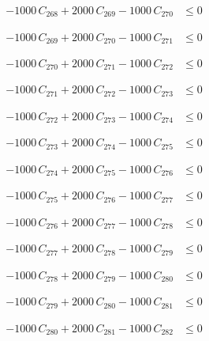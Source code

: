 \documentclass[a4paper,11pt]{article}
\begin{document}
\begin{align}
-1000\,C_{268} + 2000\,C_{269} - 1000\,C_{270} &\leq 0 \nonumber
\end{align}

\begin{align}
-1000\,C_{269} + 2000\,C_{270} - 1000\,C_{271} &\leq 0 \nonumber
\end{align}

\begin{align}
-1000\,C_{270} + 2000\,C_{271} - 1000\,C_{272} &\leq 0 \nonumber
\end{align}

\begin{align}
-1000\,C_{271} + 2000\,C_{272} - 1000\,C_{273} &\leq 0 \nonumber
\end{align}

\begin{align}
-1000\,C_{272} + 2000\,C_{273} - 1000\,C_{274} &\leq 0 \nonumber
\end{align}

\begin{align}
-1000\,C_{273} + 2000\,C_{274} - 1000\,C_{275} &\leq 0 \nonumber
\end{align}

\begin{align}
-1000\,C_{274} + 2000\,C_{275} - 1000\,C_{276} &\leq 0 \nonumber
\end{align}

\begin{align}
-1000\,C_{275} + 2000\,C_{276} - 1000\,C_{277} &\leq 0 \nonumber
\end{align}

\begin{align}
-1000\,C_{276} + 2000\,C_{277} - 1000\,C_{278} &\leq 0 \nonumber
\end{align}

\begin{align}
-1000\,C_{277} + 2000\,C_{278} - 1000\,C_{279} &\leq 0 \nonumber
\end{align}

\begin{align}
-1000\,C_{278} + 2000\,C_{279} - 1000\,C_{280} &\leq 0 \nonumber
\end{align}

\begin{align}
-1000\,C_{279} + 2000\,C_{280} - 1000\,C_{281} &\leq 0 \nonumber
\end{align}

\begin{align}
-1000\,C_{280} + 2000\,C_{281} - 1000\,C_{282} &\leq 0 \nonumber
\end{align}
\end{document}

